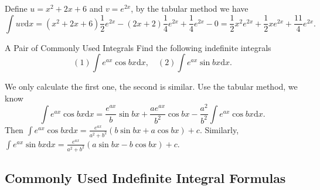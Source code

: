 \begin{solution}
  Define $u = x^2 + 2x + 6$ and $v = e^{2x}$,
  by the tabular method we have
  \begin{equation}
    \int u v \mathrm{d} x = (x^2 + 2x + 6) \frac{1}{2}e^{2x} - (2x + 2) \frac{1}{4}e^{2x}
    + \frac{1}{4} e^{2x} - 0 = \frac{1}{2}x^2 e^{2x} + \frac{1}{2} xe^{2x} + \frac{11}{4}e^{2x}.
  \end{equation}
\end{solution}

\begin{example}{A Pair of Commonly Used Integrals}{}
  Find the following indefinite integrals
  \begin{equation}
    (1) \int e^{ax} \cos bx \mathrm{d} x, \quad
    (2) \int e^{ax} \sin bx \mathrm{d} x.
  \end{equation}
\end{example}

\begin{solution}
  We only calculate the first one, the second is similar.
  Use the tabular method, we know
  \begin{equation}
    \int e^{ax}\cos bx \mathrm{d} x
    = \frac{e^{ax}}{b}\sin bx + \frac{ae^{ax}}{b^2}\cos bx
    - \frac{a^2}{b^2} \int e^{ax} \cos bx \mathrm{d} x.
  \end{equation}
  Then $\int e^{ax} \cos bx \mathrm{d} x = \frac{e^{ax}}{a^2 + b^2}(b \sin bx + a \cos
  bx) + c$.
  Similarly, $\int e^{ax} \sin bx \mathrm{d} x = \frac{e^{ax}}{a^2 + b^2}(a \sin bx - b \cos
  bx) + c$.
\end{solution}

\subsection{Commonly Used Indefinite Integral Formulas}

